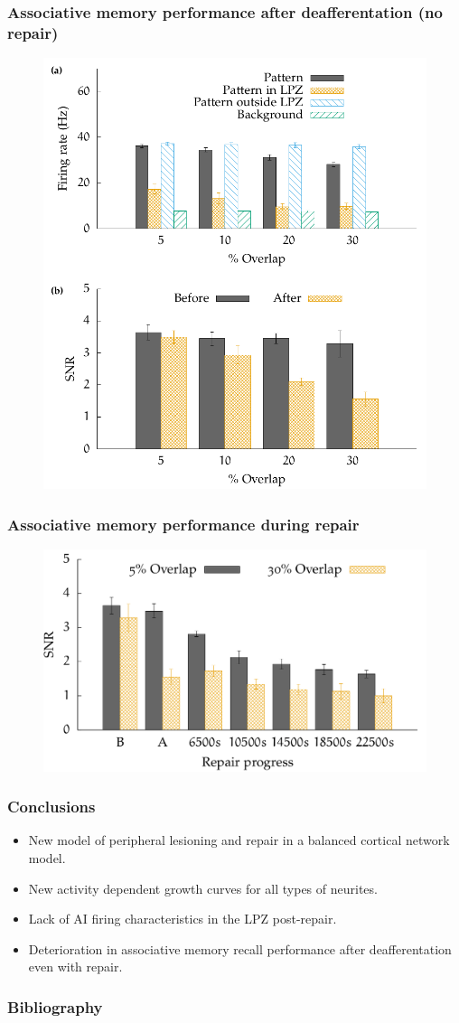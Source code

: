 \begin{frame}[c]
  \frametitle{Associative memory performance after deafferentation (no repair)}
  \begin{figure}[h]
    \centering
    \includegraphics[width=0.6\linewidth]{99_images/performance-deaff-only}
  \end{figure}
\end{frame}
\begin{frame}[c]
  \frametitle{Associative memory performance during repair}
  \begin{figure}[h]
    \centering
    \includegraphics[width=0.6\linewidth]{99_images/performance-during-repair}
  \end{figure}
\end{frame}
\begin{frame}[c]
  \frametitle{Conclusions}
  \begin{itemize}
    \item New model of peripheral lesioning and repair in a balanced cortical network model.
    \item New activity dependent growth curves for all types of neurites.
    \item Lack of AI firing characteristics in the LPZ post-repair.
    \item Deterioration in associative memory recall performance after deafferentation even with repair.
  \end{itemize}
\end{frame}
\begin{frame}[t,allowframebreaks]
  \frametitle{Bibliography}
  \printbibliography[heading=none]{}
\end{frame}


